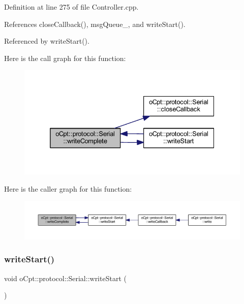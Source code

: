 Definition at line 275 of file Controller.\+cpp.



References close\+Callback(), msg\+Queue\+\_\+, and write\+Start().



Referenced by write\+Start().

Here is the call graph for this function\+:\nopagebreak
\begin{figure}[H]
\begin{center}
\leavevmode
\includegraphics[width=332pt]{classo_cpt_1_1protocol_1_1_serial_a8b1037a2eefdd4215f1d4732e168272c_cgraph}
\end{center}
\end{figure}
Here is the caller graph for this function\+:\nopagebreak
\begin{figure}[H]
\begin{center}
\leavevmode
\includegraphics[width=350pt]{classo_cpt_1_1protocol_1_1_serial_a8b1037a2eefdd4215f1d4732e168272c_icgraph}
\end{center}
\end{figure}
\hypertarget{classo_cpt_1_1protocol_1_1_serial_a1fedc27e16c383de81e5a05fee742581}{}\label{classo_cpt_1_1protocol_1_1_serial_a1fedc27e16c383de81e5a05fee742581} 
\subsubsection{\texorpdfstring{write\+Start()}{writeStart()}}
{\footnotesize\ttfamily void o\+Cpt\+::protocol\+::\+Serial\+::write\+Start (\begin{DoxyParamCaption}{ }\end{DoxyParamCaption})\hspace{0.3cm}{\ttfamily [protected]}}

